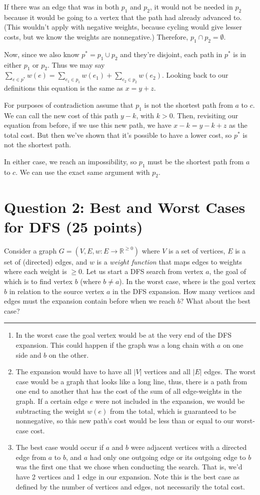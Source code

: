 \documentclass[11pt]{article}
\newcommand{\question}[1]{\section*{\normalsize #1}}
\begin{document}
If there was an edge that was in both $p_1$ and $p_2$, it would not be needed in $p_2$ because it would be going to a vertex that the path had already advanced to. (This wouldn't apply with negative weights, because cycling would give lesser costs, but we know the weights are nonnegative.) Therefore, $p_1 \cap p_2 = \emptyset$.

Now, since we also know $p^* = p_1 \cup p_2$ and they're disjoint, each path in $p^*$ is in either $p_1$ or $p_2$. Thus we may say $\sum_{e \in p^*} w(e) = \sum_{e_1 \in p_1} w(e_1) + \sum_{e_2 \in p_2} w(e_2)$. Looking back to our definitions this equation is the same as $x = y + z$.

For purposes of contradiction assume that $p_1$ is not the shortest path from $a$ to $c$. We can call the new cost of this path $y - k$, with $k > 0$. Then, revisiting our equation from before, if we use this new path, we have $x - k = y - k + z$ as the total cost. But then we've shown that it's possible to have a lower cost, so $p^*$ is not the shortest path. 

In either case, we reach an impossibility, so $p_1$ must be the shortest path from $a$ to $c$. We can use the exact same argument with $p_2$. 

\newpage

\question{Question 2: Best and Worst Cases for DFS (25 points)}
Consider a graph $G = (V, E, w: E\rightarrow \mathbb{R}^{\ge 0})$ where $V$ is a set of vertices, $E$ is a set of (directed) edges, and $w$ is a \textit{weight function} that maps edges to weights where each weight is $\ge 0$. Let us start a DFS search from vertex $a$, the goal of which is to find vertex $b$ (where $b\neq a$). In the worst case, where is the goal vertex $b$ in relation to the source vertex $a$ in the DFS expansion. How many vertices and edges must the expansion contain before when we reach $b$? What about the best case?

\medskip
\hrule
\medskip

\begin{enumerate}
    \item In the worst case the goal vertex would be at the very end of the DFS expansion. This could happen if the graph was a long chain with $a$ on one side and $b$ on the other.
    \item The expansion would have to have all $|V|$ vertices and all $|E|$ edges. The worst case would be a graph that looks like a long line, thus, there is a path from one end to another that has the cost of the sum of all edge-weights in the graph. If a certain edge $e$ were not included in the expansion, we would be subtracting the weight $w(e)$ from the total, which is guaranteed to be nonnegative, so this new path's cost would be less than or equal to our worst-case cost.
    \item The best case would occur if $a$ and $b$ were adjacent vertices with a directed edge from $a$ to $b$, and $a$ had only one outgoing edge or its outgoing edge to $b$ was the first one that we chose when conducting the search. That is, we'd have 2 vertices and 1 edge in our expansion. Note this is the best case as defined by the number of vertices and edges, not necessarily the total cost.
\end{enumerate}
\end{document}
